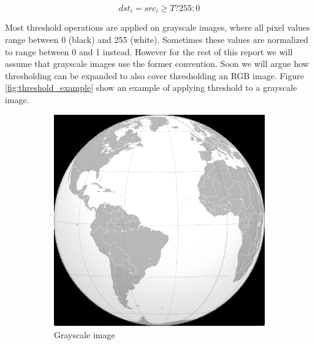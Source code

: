 \begin{equation}
dst_i = src_i \geq T ? 255: 0
\label{eq:binarythresholding}
\end{equation}

Most threshold operations are applied on grayscale images, where all pixel values range between 0 (black) and 255 (white). Sometimes these values are normalized to range between 0 and 1 instead. However for the rest of this report we will assume that grayscale images use the former convention. Soon we will argue how thresholding can be expanded to also cover thresholding an RGB image. Figure \ref{fig:threshold_example} show an example of applying threshold to a grayscale image.

\begin{figure}
        \centering
        \begin{subfigure}[b]{0.3\textwidth}
                \includegraphics[scale = 0.2]{img/globe}
                \caption{Grayscale image}
        \end{subfigure}
		\quad
        \begin{subfigure}[b]{0.3\textwidth}

\end{subfigure}
\end{figure}

